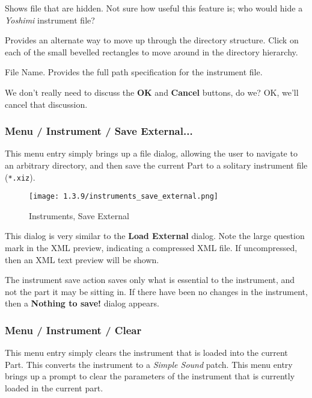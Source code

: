    Shows file that are hidden.  Not sure how useful this feature is;
   who would hide a \textsl{Yoshimi} instrument file?

   Provides an alternate way to move up through the directory structure.
   Click on each of the small bevelled rectangles to move around in the
   directory hierarchy.

   File Name.
   Provides the full path specification for the instrument file.

   We don't really need to discuss the \textbf{OK} and \textbf{Cancel}
   buttons, do we?  OK, we'll cancel that discussion.

\subsubsection{Menu / Instrument / Save External...}
\label{subsubsec:menu_instrument_save}

   This menu entry simply brings up a file dialog, allowing the user to
   navigate to an arbitrary directory, and then save the current Part
   to a solitary instrument file (\texttt{*.xiz}).

\begin{figure}[H]
   \centering 
   \texttt{[image: 1.3.9/instruments\_save\_external.png]}
   \caption{Instruments, Save External}
   \label{fig:instruments_save_external}
\end{figure}

   This dialog is very similar to the \textbf{Load External} dialog.
   Note the large question mark in the XML preview, indicating a compressed XML
   file.  If uncompressed, then an XML text preview will be shown.

   The instrument save action saves only what is essential to the instrument,
   and not the part it may be sitting in.  If there have been no changes in the
   instrument, then a \textbf{Nothing to save!} dialog appears.

\subsubsection{Menu / Instrument / Clear}
\label{subsubsec:menu_instrument_clear}

   This menu entry simply clears the instrument that is loaded into the current
   Part.  This converts the instrument to a 
   \textsl{Simple Sound} patch.
   This menu entry brings up a prompt to clear the parameters of the
   instrument that is currently loaded in the current part.

